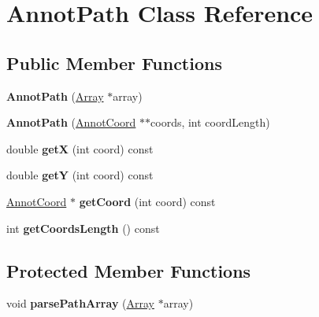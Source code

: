 \hypertarget{class_annot_path}{}\section{Annot\+Path Class Reference}
\label{class_annot_path}
\subsection*{Public Member Functions}
\begin{DoxyCompactItemize}
\item 
\mbox{\label{class_annot_path_ad86c55401ff66cdaddc94105f265c01a}} 
{\bfseries Annot\+Path} (\hyperlink{class_array}{Array} $\ast$array)
\item 
\mbox{\label{class_annot_path_a8c1f2c978012ab7a25267eabac63a29e}} 
{\bfseries Annot\+Path} (\hyperlink{class_annot_coord}{Annot\+Coord} $\ast$$\ast$coords, int coord\+Length)
\item 
\mbox{\label{class_annot_path_a5f4779c9332aec3898de5416d2799cc8}} 
double {\bfseries getX} (int coord) const
\item 
\mbox{\label{class_annot_path_a49c055e8a9aefd592ff6819cb70bcc85}} 
double {\bfseries getY} (int coord) const
\item 
\mbox{\label{class_annot_path_a6c1e721e8a2dff883f5b0f17a0a84dfd}} 
\hyperlink{class_annot_coord}{Annot\+Coord} $\ast$ {\bfseries get\+Coord} (int coord) const
\item 
\mbox{\label{class_annot_path_a10da1b1ef65db706130fcebc6ca811d7}} 
int {\bfseries get\+Coords\+Length} () const
\end{DoxyCompactItemize}
\subsection*{Protected Member Functions}
\begin{DoxyCompactItemize}
\item 
\mbox{\label{class_annot_path_ab99164e55dbde369be84b017061c8354}} 
void {\bfseries parse\+Path\+Array} (\hyperlink{class_array}{Array} $\ast$array)
\end{DoxyCompactItemize}
